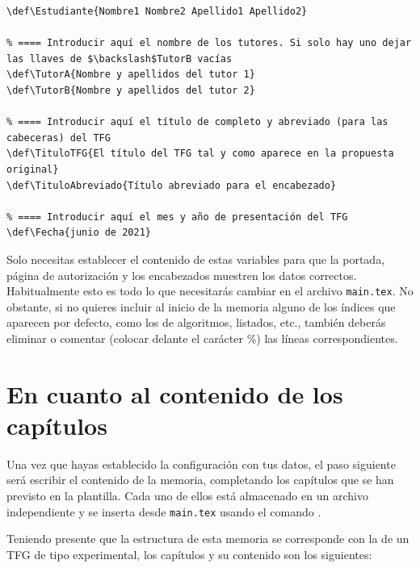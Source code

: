 \begin{lstlisting}[caption={Variables a establecer en \texttt{main.tex}},language={[LaTeX]TeX},label=List.Variables]
% ==== Introducir aquí el nombre del estudiante
\def\Estudiante{Nombre1 Nombre2 Apellido1 Apellido2}

% ==== Introducir aquí el nombre de los tutores. Si solo hay uno dejar las llaves de $\backslash$TutorB vacías
\def\TutorA{Nombre y apellidos del tutor 1}
\def\TutorB{Nombre y apellidos del tutor 2}

% ==== Introducir aquí el título de completo y abreviado (para las cabeceras) del TFG
\def\TituloTFG{El título del TFG tal y como aparece en la propuesta original}
\def\TituloAbreviado{Título abreviado para el encabezado}

% ==== Introducir aquí el mes y año de presentación del TFG
\def\Fecha{junio de 2021}
\end{lstlisting}

Solo necesitas establecer el contenido de estas variables para que la portada, página de autorización y los encabezados muestren los datos correctos. Habitualmente esto es todo lo que necesitarás cambiar en el archivo \texttt{main.tex}. No obstante, si no quieres incluir al inicio de la memoria alguno de los índices que aparecen por defecto, como los de algoritmos, listados, etc., también deberás eliminar o comentar (colocar delante el carácter \%) las líneas correspondientes.

\section{En cuanto al contenido de los capítulos}

Una vez que hayas establecido la configuración con tus datos, el paso siguiente será escribir el contenido de la memoria, completando los capítulos que se han previsto en la plantilla. Cada uno de ellos está almacenado en un archivo independiente y se inserta desde \texttt{main.tex} usando el comando \verb||.

Teniendo presente que la estructura de esta memoria se corresponde con la de un TFG de tipo experimental, los capítulos y su contenido son los siguientes:

